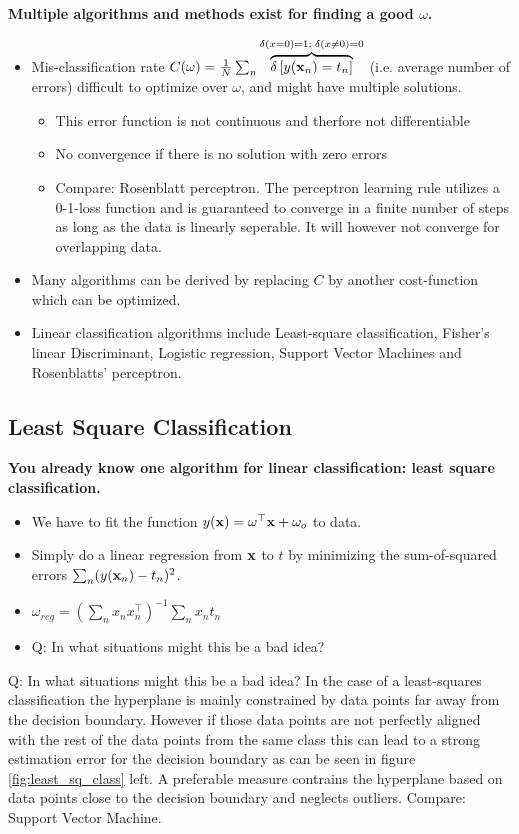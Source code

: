 \textbf{Multiple algorithms and methods exist for finding a good $\omega$.} 
\begin{itemize}
\item Mis-classification rate $C(\omega)= \frac{1}{N} \sum_n \overbrace{\delta\left[y({\mathbf{x}}_n) =t_n\right]}^{\delta(x=0) = 1; \; \delta(x \not= 0) = 0}$ (i.e. average number of errors) difficult to optimize over $\omega$, and might have multiple solutions.
	\begin{itemize}
		\item This error function is not continuous and therfore not differentiable	
		\item No convergence if there is no solution with zero errors
		\item Compare: Rosenblatt perceptron. The perceptron learning rule utilizes a 0-1-loss function and is guaranteed to converge in a finite number of steps as long as the data is linearly seperable. It will however not converge for overlapping data.
	\end{itemize}
\item  Many algorithms can be derived by replacing $C$ by another cost-function which can be optimized.
\item  Linear classification algorithms include Least-square classification, Fisher's linear Discriminant, Logistic regression, Support Vector Machines and Rosenblatts' perceptron.
\end{itemize}


\subsection{Least Square Classification}
\textbf{You already know one algorithm for linear classification: least square classification.} 
\begin{itemize}
\item We have to fit the function $y({\mathbf{x}})= \omega^\top {\mathbf{x}}+ \omega_o $ to data.
\item  Simply do a linear regression from ${\mathbf{x}}$ to $t$ by minimizing the sum-of-squared errors $\sum_n (y({\mathbf{x}}_n)-t_n)^2$.
\item  $\omega_{reg}=  \left(\sum_n x_n x_n^\top  \right)^{-1} \sum_n x_n t_n$
\item  Q: In what situations might this be a bad idea?
\end{itemize}

\begin{bbbox}{Q: In what situations might this be a bad idea?}
	In the case of a least-squares classification the hyperplane is mainly constrained by data points far away from the decision boundary. However if those data points are not perfectly aligned with the rest of the data points from the same class this can lead to a strong estimation error for the decision boundary as can be seen in figure \ref{fig:least_sq_class} left. A preferable measure contrains the hyperplane based on data points close to the decision boundary and neglects outliers. Compare: Support Vector Machine.
\end{bbbox}

